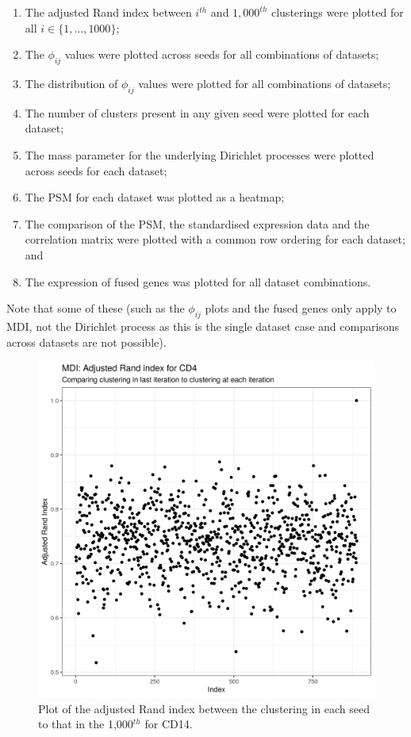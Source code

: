 \documentclass[12pt]{article} %
\begin{document}
	\begin{enumerate}
		\item The adjusted Rand index between $i^{th}$ and $1,000^{th}$ clusterings were plotted for all $i\in \{1,\ldots,1000\}$;
		\item The $\phi_{ij}$ values were plotted across seeds for all combinations of datasets;
		\item The distribution of $\phi_{ij}$ values were plotted for all combinations of datasets;
		\item The number of clusters present in any given seed were plotted for each dataset;
		\item The mass parameter for the underlying Dirichlet processes were plotted across seeds for each dataset;
		\item The PSM for each dataset was plotted as a heatmap;
		\item The comparison of the PSM, the standardised expression data and the correlation matrix were plotted with a common row ordering for each dataset; and
		\item The expression of fused genes was plotted for all dataset combinations.
	\end{enumerate}
	Note that some of these (such as the $\phi_{ij}$ plots and the fused genes only apply to MDI, not the Dirichlet process as this is the single dataset case and comparisons across datasets are not possible).

	\newpage
	
	\begin{figure}[h]
		\centering
		\includegraphics[scale=0.75]{Images/Biology_data/All_datasets/Adjusted_rand_index_plots/rand_index_plot_CD4.png}
		\caption{Plot of the adjusted Rand index between the clustering in each seed to that in the 1,000$^{th}$ for CD14.}
		\label{fig:mdi_cd4_adj_rand_ind_plot}
	\end{figure}
	
\end{document}
